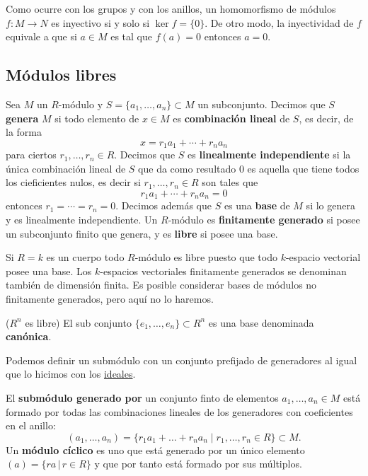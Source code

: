 

Como ocurre con los grupos y con los anillos, un homomorfismo de módulos
\(f\colon M\rightarrow N\) es inyectivo si y solo si \(\ker f=\{0\}\).
De otro modo, la inyectividad de \(f\) equivale a que si \(a\in M\) es
tal que \(f(a)=0\) entonces \(a=0\). 

\hypertarget{muxf3dulos-libres}{%
\subsection{Módulos libres}\label{muxf3dulos-libres}}


Sea \(M\) un \(R\)-módulo y \(S=\{a_1,\dots,a_n\}\subset M\) un
subconjunto. Decimos que \(S\) \textbf{genera} \(M\) si todo elemento de
\(x\in M\) es \textbf{combinación lineal} de \(S\), es decir, de la
forma \[x=r_1a_1+\cdots+r_na_n\] para ciertos
\(r_1,\dots,r_n\in R\). Decimos que \(S\) es \textbf{linealmente
independiente} si la única combinación lineal de \(S\) que da como
resultado \(0\) es aquella que tiene todos los cieficientes nulos, es
decir si \(r_1,\dots,r_n\in R\) son tales que
\[r_1a_1+\cdots+r_na_n=0\] entonces \(r_1=\cdots=r_n=0\). Decimos
además que \(S\) es una \textbf{base} de \(M\) si lo genera y es
linealmente independiente. Un \(R\)-módulo es \textbf{finitamente
generado} si posee un subconjunto finito que genera, y es \textbf{libre}
si posee una base. 


Si \(R=k\) es un cuerpo todo \(R\)-módulo es libre puesto que todo
\(k\)-espacio vectorial posee una base. Los \(k\)-espacios vectoriales
finitamente generados se denominan también de dimensión finita. Es
posible considerar bases de módulos no finitamente generados, pero aquí
no lo haremos. 

\textrm{\normalfont ($R^n$ es libre)} El sub conjunto
\(\{e_1,\dots,e_n\}\subset R^n\) es una base denominada
\textbf{canónica}. 

Podemos definir un submódulo con un conjunto prefijado de generadores al
igual que lo hicimos con los
\href{/estalg/rings/definitions/\#generators}{ideales}.


El \textbf{submódulo generado por} un conjunto finto de elementos
\(a_1,\dots,a_n\in M\) está formado por todas las combinaciones lineales
de los generadores con coeficientes en el anillo:
\[(a_1,\dots,a_n)=\{r_1a_1+\dots+r_na_n\;|\; r_1,\dots,r_n\in R\}\subset M.\]
Un \textbf{módulo cíclico} es uno que está generado por un único
elemento \((a)=\{ra\,|\, r\in R\}\) y que por tanto está formado por
sus múltiplos. 

